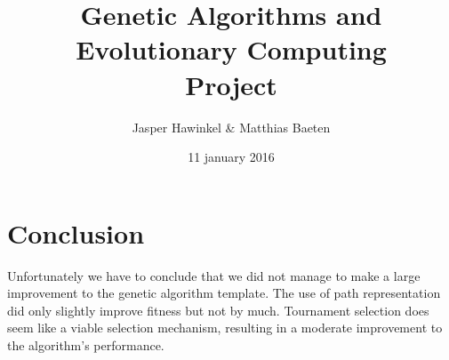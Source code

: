 


\title{Genetic Algorithms and Evolutionary Computing \\ Project}
\author{ Jasper Hawinkel \& Matthias Baeten }
\date{ 11 january 2016}





	\maketitle
	\tableofcontents
	
	
	
	
	\section{Conclusion}
	Unfortunately we have to conclude that we did not manage to make a large improvement to the genetic algorithm template. The use of path representation did only slightly improve fitness but not by much. Tournament selection does seem like a viable selection mechanism, resulting in a moderate improvement to the algorithm's performance. 
	
	
	\FloatBarrier
	
	
	


